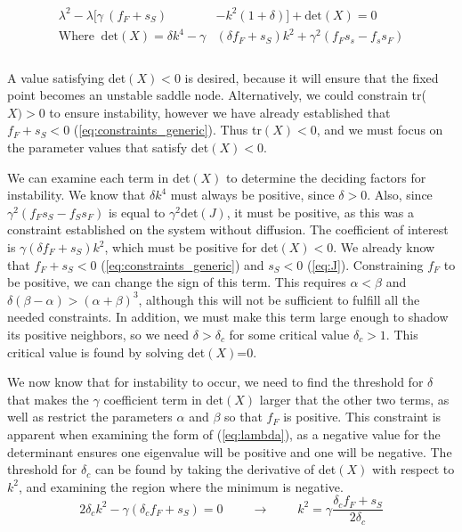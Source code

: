 \documentclass[12pt]{article}
\begin{document}
\begin{equation}
\label{eq:quad}
    \begin{aligned}
        \lambda^2 - \lambda[\gamma~(f_F+s_S)&-k^2(1+\delta)] + \text{det}(X)=0 \\
        \text{Where } ~ \text{det}(X) = \delta k^4-\gamma&(\delta f_F + s_S)k^2 + \gamma^2(f_Fs_s-f_ss_F) \\
    \end{aligned}
\end{equation}
\\
A value satisfying det$(X)<0$ is desired, because it will ensure that the fixed point becomes an unstable saddle node. Alternatively, we could constrain tr($X)>0$ to ensure instability, however we have already established that $f_F+s_S<0$ (\ref{eq:constraints_generic}). Thus tr$(X)<0$, and we must focus on the parameter values that satisfy det$(X)<0$. 

We can examine each term in det$(X)$ to determine the deciding factors for instability. We know that $\delta k^4$ must always be positive, since $\delta>0$. Also, since $\gamma^2(f_Fs_S-f_Ss_F)$ is equal to $\gamma^2$det$(J)$, it must be positive, as this was a constraint established on the system without diffusion. The coefficient of interest is $\gamma(\delta f_F+s_S)k^2$, which must be positive for det$(X)<0$. We already know that $f_F+s_S<0$ (\ref{eq:constraints_generic}) and $s_S<0$ (\ref{eq:J}). Constraining $f_F$ to be positive, we can change the sign of this term. This requires $\alpha<\beta$ and $ \delta(\beta-\alpha) > (\alpha+\beta)^3$, although this will not be sufficient to fulfill all the needed constraints. In addition, we must make this term large enough to shadow its positive neighbors, so we need $\delta>\delta_c$ for some critical value $\delta_c>1$. This critical value is found by solving det$(X)$=0.

We now know that for instability to occur, we need to find the threshold for $\delta$ that makes the $\gamma$ coefficient term in det$(X)$ larger that the other two terms, as well as restrict the parameters $\alpha$ and $\beta$ so that $f_F$ is positive. This constraint is apparent when examining the form of (\ref{eq:lambda}), as a negative value for the determinant ensures one eigenvalue will be positive and one will be negative. The threshold for $\delta_c$ can be found by taking the derivative of det$(X)$ with respect to $k^2$, and examining the region where the minimum is negative.
\begin{equation}
\label{eq:kval}
    2\delta_c k^2-\gamma(\delta_c f_F+s_S) = 0 ~~~~~~~~~~ \longrightarrow ~~~~~~~~~~ k^2 = \gamma\frac{\delta_c f_F+s_S}{2\delta_c}
\end{equation}
\end{document}
